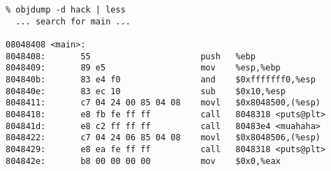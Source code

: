 \documentclass[a4paper,12pt]{article}
\begin{document}
\begin{verbatim}
% objdump -d hack | less
  ... search for main ...

08048408 <main>:
8048408:       55                      push   %ebp
8048409:       89 e5                   mov    %esp,%ebp
804840b:       83 e4 f0                and    $0xfffffff0,%esp
804840e:       83 ec 10                sub    $0x10,%esp
8048411:       c7 04 24 00 85 04 08    movl   $0x8048500,(%esp)
8048418:       e8 fb fe ff ff          call   8048318 <puts@plt>
804841d:       e8 c2 ff ff ff          call   80483e4 <muahaha>
8048422:       c7 04 24 06 85 04 08    movl   $0x8048506,(%esp)
8048429:       e8 ea fe ff ff          call   8048318 <puts@plt>
804842e:       b8 00 00 00 00          mov    $0x0,%eax
 \end{verbatim}
\end{document}
